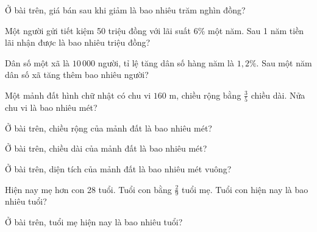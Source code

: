 \begin{ex}
  Ở bài trên, giá bán sau khi giảm là bao nhiêu trăm nghìn đồng?
\end{ex}

\begin{ex}
  Một người gửi tiết kiệm 50 triệu đồng với lãi suất $6\%$ một năm. Sau 1 năm tiền lãi nhận được là bao nhiêu triệu đồng?
\end{ex}

\begin{ex}
  Dân số một xã là $10\,000$ người, tỉ lệ tăng dân số hàng năm là $1{,}2\%$. Sau một năm dân số xã tăng thêm bao nhiêu người?
\end{ex}

\begin{ex}
  Một mảnh đất hình chữ nhật có chu vi $160\text{ m}$, chiều rộng bằng $\frac{3}{5}$ chiều dài. Nửa chu vi là bao nhiêu mét?
\end{ex}

\begin{ex}
  Ở bài trên, chiều rộng của mảnh đất là bao nhiêu mét?
\end{ex}

\begin{ex}
  Ở bài trên, chiều dài của mảnh đất là bao nhiêu mét?
\end{ex}

\begin{ex}
  Ở bài trên, diện tích của mảnh đất là bao nhiêu mét vuông?
\end{ex}

\begin{ex}
  Hiện nay mẹ hơn con 28 tuổi. Tuổi con bằng $\frac{2}{9}$ tuổi mẹ. Tuổi con hiện nay là bao nhiêu tuổi?
\end{ex}

\begin{ex}
  Ở bài trên, tuổi mẹ hiện nay là bao nhiêu tuổi?
\end{ex}


